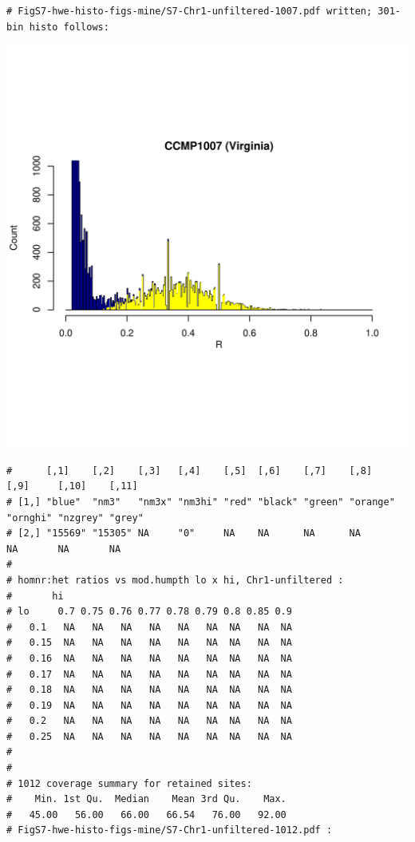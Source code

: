\documentclass{article}\usepackage[]{graphicx}\usepackage[]{color}
\makeatletter
\def\maxwidth{ %
  \ifdim\Gin@nat@width>\linewidth
    \linewidth
  \else
    \Gin@nat@width
  \fi
}
\newenvironment{kframe}{%
 \def\at@end@of@kframe{}%
 \ifinner\ifhmode%
  \def\at@end@of@kframe{\end{minipage}}%
  \begin{minipage}{\columnwidth}%
 \fi\fi%
 \def\FrameCommand##1{\hskip\@totalleftmargin \hskip-\fboxsep
 \colorbox{shadecolor}{##1}\hskip-\fboxsep
     \hskip-\linewidth \hskip-\@totalleftmargin \hskip\columnwidth}%
 \MakeFramed {\advance\hsize-\width
   \@totalleftmargin\z@ \linewidth\hsize
   \@setminipage}}%
 {\par\unskip\endMakeFramed%
 \at@end@of@kframe}
\newenvironment{knitrout}{}{} %
\makeatother
\begin{document}
\begin{knitrout}
\begin{kframe}
\begin{verbatim}
# FigS7-hwe-histo-figs-mine/S7-Chr1-unfiltered-1007.pdf written; 301-bin histo follows:
\end{verbatim}
\end{kframe}
\includegraphics[width=\maxwidth]{FigS7-hwe-histo-figs-knitr/unnamed-chunk-10-15} 
\begin{kframe}\begin{verbatim}
#      [,1]    [,2]    [,3]   [,4]    [,5]  [,6]    [,7]    [,8]     [,9]     [,10]    [,11] 
# [1,] "blue"  "nm3"   "nm3x" "nm3hi" "red" "black" "green" "orange" "ornghi" "nzgrey" "grey"
# [2,] "15569" "15305" NA     "0"     NA    NA      NA      NA       NA       NA       NA
# 
# homnr:het ratios vs mod.humpth lo x hi, Chr1-unfiltered :
#       hi
# lo     0.7 0.75 0.76 0.77 0.78 0.79 0.8 0.85 0.9
#   0.1   NA   NA   NA   NA   NA   NA  NA   NA  NA
#   0.15  NA   NA   NA   NA   NA   NA  NA   NA  NA
#   0.16  NA   NA   NA   NA   NA   NA  NA   NA  NA
#   0.17  NA   NA   NA   NA   NA   NA  NA   NA  NA
#   0.18  NA   NA   NA   NA   NA   NA  NA   NA  NA
#   0.19  NA   NA   NA   NA   NA   NA  NA   NA  NA
#   0.2   NA   NA   NA   NA   NA   NA  NA   NA  NA
#   0.25  NA   NA   NA   NA   NA   NA  NA   NA  NA
# 
# 
# 1012 coverage summary for retained sites:
#    Min. 1st Qu.  Median    Mean 3rd Qu.    Max. 
#   45.00   56.00   66.00   66.54   76.00   92.00 
# FigS7-hwe-histo-figs-mine/S7-Chr1-unfiltered-1012.pdf :

\end{verbatim}
\end{kframe}
\end{knitrout}
\end{document}
